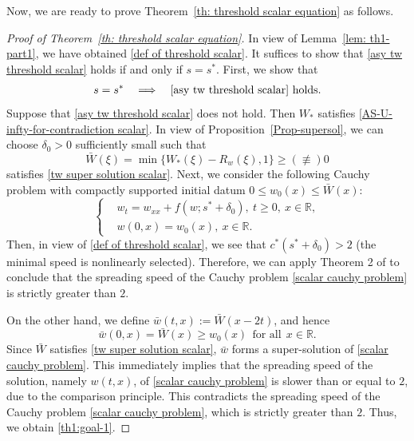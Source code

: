 \documentclass[11pt,a4paper]{article}
\numberwithin{equation}{section}
\numberwithin{figure}{section}
\newcommand{\red}[1]{{\color{red}#1}}
\newcommand\bea{\begin{eqnarray}}
\newcommand\eea{\end{eqnarray}}
\begin{document}
Now, we are ready to prove Theorem~\ref{th: threshold scalar equation} as follows.

\begin{proof}[Proof of Theorem~\ref{th: threshold scalar equation}]
In view of Lemma~\ref{lem: th1-part1}, we have obtained \eqref{def of threshold scalar}.
It suffices to show that \eqref{asy tw threshold scalar} holds if and only if $s=s^*$.
First, we show that
\bea\label{th1:goal-1}
s=s^* \quad \Longrightarrow \quad \mbox{\eqref{asy tw threshold scalar} holds}.
\eea
Suppose that \eqref{asy tw threshold scalar} does not hold. Then $W_*$ satisfies \eqref{AS-U-infty-for-contradiction scalar}. In view of Proposition~\ref{Prop-supersol}, we can
choose $\delta_0>0$ sufficiently small such that
$$\bar W(\xi)= \min\{W_*(\xi)-R_w(\xi),1\}\geq(\not\equiv) 0$$
satisfies \eqref{tw super solution scalar}. Next,
we consider the following Cauchy problem with compactly supported initial datum $0\le w_0(x)\leq \bar W(x)$:
\begin{equation}\label{scalar cauchy problem}
\left\{
\begin{aligned}
&w_t=w_{xx}+f(w;s^*+\delta_0),\ t\ge 0,\ x\in\mathbb{R},\\
&w(0,x)=w_0(x),\ x\in\mathbb{R}.
\end{aligned}
\right.
\end{equation}
Then, in view of \eqref{def of threshold scalar}, we see that $c^*(s^*+\delta_0)>2$ (the minimal speed is nonlinearly selected). Therefore, we can apply Theorem 2 of \cite{Rothe1981}
to conclude that the spreading speed of the Cauchy problem \eqref{scalar cauchy problem} is strictly greater than $2$.

On the other hand, we
define $\bar{w}(t,x):=\bar W(x-2 t)$, and hence 
$$\bar{w}(0,x)=\bar W(x)\geq w_0(x)\ \ \text{for all}\ \ x\in\mathbb{R}.$$
Since $\bar W$ satisfies \eqref{tw super solution scalar},
$\bar{w}$ forms a super-solution of \eqref{scalar cauchy problem}.
This immediately implies that the spreading speed of the solution, %
namely $w(t,x)$, of \eqref{scalar cauchy problem} is slower than or equal to $2$, due to the comparison principle.
This contradicts the spreading speed of the Cauchy problem \eqref{scalar cauchy problem}, which is strictly greater than $2$.
Thus, we obtain \eqref{th1:goal-1}.


\end{proof}
\end{document}
